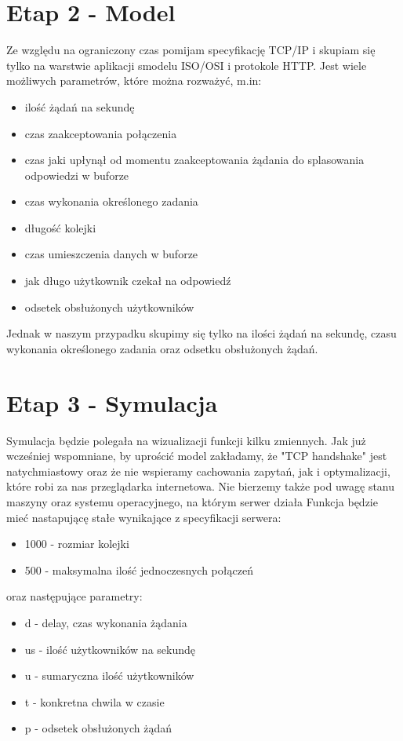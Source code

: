 \documentclass{article}
\begin{document}
    \section{Etap 2 - Model}
    Ze względu na ograniczony czas pomijam specyfikację TCP/IP i skupiam się tylko na warstwie aplikacji smodelu ISO/OSI i protokole HTTP.\newline
    Jest wiele możliwych parametrów, które można rozważyć, m.in:
    \begin{itemize}
        \item ilość żądań na sekundę
        \item czas zaakceptowania połączenia
        \item czas jaki upłynął od momentu zaakceptowania żądania do splasowania odpowiedzi w buforze
        \item czas wykonania określonego zadania
        \item długość kolejki
        \item czas umieszczenia danych w buforze
        \item jak długo użytkownik czekał na odpowiedź
        \item odsetek obsłużonych użytkowników
    \end{itemize}

    Jednak w naszym przypadku skupimy się tylko na ilości żądań na sekundę, czasu wykonania określonego zadania oraz
    odsetku obsłużonych żądań.


    \section{Etap 3 - Symulacja}
    Symulacja będzie polegała na wizualizacji funkcji kilku zmiennych. \newline
    Jak już wcześniej wspomniane, by uprościć model zakładamy, że "TCP handshake" jest natychmiastowy oraz
    że nie wspieramy cachowania zapytań, jak i optymalizacji, które robi za nas przeglądarka internetowa.
    Nie bierzemy także pod uwagę stanu maszyny oraz systemu operacyjnego, na którym serwer działa
    Funkcja będzie mieć nastapującę stałe wynikające z specyfikacji serwera:
    \begin{itemize}
        \item 1000 - rozmiar kolejki
        \item 500 - maksymalna ilość jednoczesnych połączeń
    \end{itemize} oraz następujące parametry:
    \begin{itemize}
        \item d - delay, czas wykonania żądania
        \item us - ilość użytkowników na sekundę
        \item u - sumaryczna ilość użytkowników
        \item t - konkretna chwila w czasie
        \item p - odsetek obsłużonych żądań
    \end{itemize}
\end{document}
